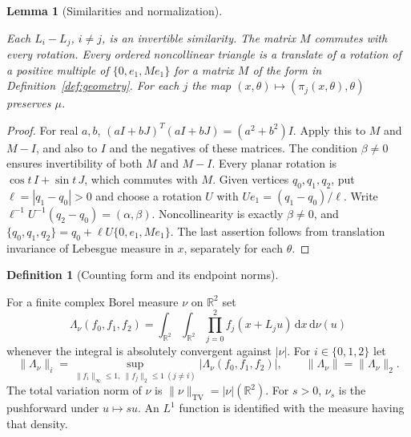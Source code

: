 \documentclass[11pt]{amsart}
\newcommand{\R}{\mathbb R}
\newcommand{\dd}{\,\mathrm d}
\DeclareMathOperator{\TV}{TV}
\newtheorem{lemma}[theorem]{Lemma}
\theoremstyle{definition}
\newtheorem{definition}[theorem]{Definition}
\theoremstyle{remark}
\numberwithin{equation}{section}
\providecommand{\lean}[1]{}
\providecommand{\leanok}{}
\begin{document}
\begin{lemma}[Similarities and normalization]\label{lem:geometry}
\lean{Auto.lem_geometry_differences,Auto.lem_geometry_commute,Auto.lem_geometry_normalization,Auto.lem_geometry_measurePreserving}
\leanok
Each $L_i-L_j$, $i\ne j$, is an invertible similarity.  The matrix
$M$ commutes with every rotation.  Every ordered noncollinear
triangle is a translate of a rotation of a positive multiple of
$\{0,e_1,Me_1\}$ for a matrix $M$ of the form in
Definition~\ref{def:geometry}.  For each $j$ the map
$(x,\theta)\mapsto(\pi_j(x,\theta),\theta)$ preserves $\mu$.
\end{lemma}
\begin{proof}
For real $a,b$,
$(aI+bJ)^T(aI+bJ)=(a^2+b^2)I$.  Apply this to $M$ and $M-I$,
and also to $I$ and the negatives of these matrices.  The condition
$\beta\ne0$ ensures invertibility of both $M$ and $M-I$.
Every planar rotation is $\cos t\,I+\sin t\,J$, which commutes
with $M$.  Given vertices $q_0,q_1,q_2$, put
$\ell=|q_1-q_0|>0$ and choose a rotation $U$ with
$Ue_1=(q_1-q_0)/\ell$.  Write
$\ell^{-1}U^{-1}(q_2-q_0)=(\alpha,\beta)$.  Noncollinearity is
exactly $\beta\ne0$, and
$\{q_0,q_1,q_2\}=q_0+\ell U\{0,e_1,Me_1\}$.
The last assertion follows from translation invariance of
Lebesgue measure in $x$, separately for each $\theta$.
\end{proof}

\begin{definition}[Counting form and its endpoint norms]\label{def:form}
\lean{Auto.FCMeasure,Auto.form,Auto.endNorm,Auto.formNorm,Auto.FCMeasure.tv,Auto.FCMeasure.dil}
For a finite complex Borel measure $\nu$ on $\R^2$ set
\[
 \Lambda_\nu(f_0,f_1,f_2)
  =\int_{\R^2}\int_{\R^2}
    \prod_{j=0}^2 f_j(x+L_ju)\dd x\dd\nu(u)
\]
whenever the integral is absolutely convergent against $|\nu|$.
For $i\in\{0,1,2\}$ let
\[
 \|\Lambda_\nu\|_i
   =\sup_{\|f_i\|_\infty\le1,\ \|f_j\|_2\le1\ (j\ne i)}
          |\Lambda_\nu(f_0,f_1,f_2)|,
 \qquad \|\Lambda_\nu\|=\|\Lambda_\nu\|_2.
\]
The total variation norm of $\nu$ is $\|\nu\|_{\TV}=|\nu|(\R^2)$.
For $s>0$, $\nu_s$ is the pushforward under $u\mapsto su$.
An $L^1$ function is identified with the measure having that density.
\end{definition}
\end{document}
